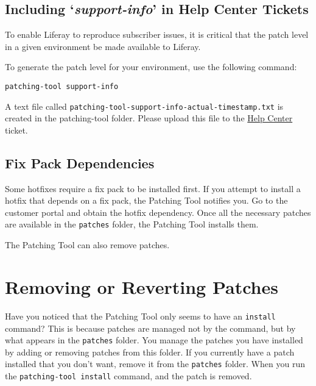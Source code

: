 \subsection{\texorpdfstring{Including `\emph{support-info}' in Help
Center
Tickets}{Including `support-info' in Help Center Tickets}}\label{including-support-info-in-help-center-tickets}

To enable Liferay to reproduce subscriber issues, it is critical that
the patch level in a given environment be made available to Liferay.

To generate the patch level for your environment, use the following
command:

\begin{verbatim}
patching-tool support-info
\end{verbatim}

A text file called
\texttt{patching-tool-support-info-actual-timestamp.txt} is created in
the patching-tool folder. Please upload this file to the
\href{https://help.liferay.com/hc}{Help Center} ticket.

\subsection{Fix Pack Dependencies}\label{fix-pack-dependencies}

Some hotfixes require a fix pack to be installed first. If you attempt
to install a hotfix that depends on a fix pack, the Patching Tool
notifies you. Go to the customer portal and obtain the hotfix
dependency. Once all the necessary patches are available in the
\texttt{patches} folder, the Patching Tool installs them.

The Patching Tool can also remove patches.

\section{Removing or Reverting
Patches}\label{removing-or-reverting-patches}

Have you noticed that the Patching Tool only seems to have an
\texttt{install} command? This is because patches are managed not by the
command, but by what appears in the \texttt{patches} folder. You manage
the patches you have installed by adding or removing patches from this
folder. If you currently have a patch installed that you don't want,
remove it from the \texttt{patches} folder. When you run the
\texttt{patching-tool\ install} command, and the patch is removed.

